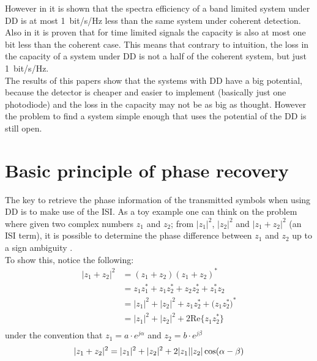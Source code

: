 However in \cite{Mecozzi_2018} it is shown that the spectra efficiency of a band limited system under DD is at most \SI{1}{bit/\s/\Hz} less than the same system under coherent detection. Also in \cite{Tasbihi_Capacity} it is proven that for time limited signals  the capacity is also at most one bit less than the coherent case. This means that contrary to intuition, the loss in the capacity of a system under DD is not a half of the coherent system, but just \SI{1}{bit/\s/\Hz}.\\

The results of this papers show that the systems with DD have a big potential, because the detector is cheaper and easier to implement (basically just one photodiode) and the loss in the capacity may not be as big as thought. However the problem to find a system simple enough that uses the potential of the DD is still open. 



\section{Basic principle of phase recovery}

The key to retrieve the phase information of the transmitted symbols when using DD is to make use of the ISI. As a toy example one can think on the problem where given two complex numbers $z_1$ and $z_2$; from $|z_1|^2$, $|z_2|^2$ and $|z_1+z_2|^2$ (an ISI term), it is possible to determine the phase difference between $z_1$ and $z_2$ up to a sign ambiguity \cite{Tasbihi_Tukey}.\\

To show this, notice the following:
\begin{align*}
	|z_1+z_2|^2 &= (z_1+z_2)(z_1+z_2)^* \\
	&=z_1z_1^*+z_1z_2^*+z_2z_2^*+z_1^*z_2\\
	&=|z_1|^2+|z_2|^2+z_1z_2^*+\bigl(z_1z_2^*\bigr)^*\\
	&=|z_1|^2+|z_2|^2+2\text{Re}\{z_1z_2^*\}\\
\end{align*}
under the convention that $z_1 = a\cdot e^{j\alpha}$ and $z_2 = b\cdot e^{j\beta}$
\begin{equation}
	|z_1+z_2|^2 =|z_1|^2+|z_2|^2+2|z_1||z_2|\cos(\alpha-\beta)\\
	\label{eq:square_mag_of_sum}
\end{equation}

